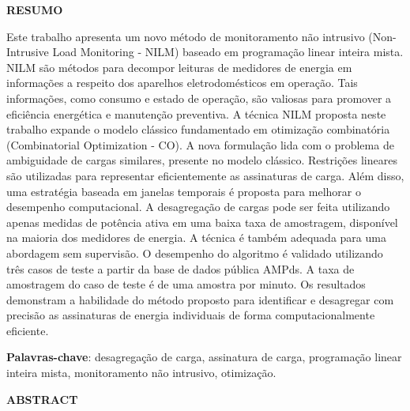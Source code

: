     
\newpage

\begin{center}
  \large{\textbf{RESUMO}}
\end{center}

Este trabalho apresenta um novo método de monitoramento não intrusivo (Non-Intrusive Load Monitoring - NILM) baseado em programação linear inteira mista. NILM são métodos para decompor leituras de medidores de energia em informações a respeito dos aparelhos eletrodomésticos em operação. Tais informações, como consumo e estado de operação, são valiosas para promover a eficiência energética e manutenção preventiva. A técnica NILM proposta neste trabalho expande o modelo clássico fundamentado em otimização combinatória (Combinatorial Optimization - CO). A nova formulação lida com o problema de ambiguidade de cargas similares, presente no modelo clássico. Restrições lineares são utilizadas para representar eficientemente as assinaturas de carga. Além disso, uma estratégia baseada em janelas temporais é proposta para melhorar o desempenho computacional. A desagregação de cargas pode ser feita utilizando apenas medidas de potência ativa em uma baixa taxa de amostragem, disponível na maioria dos medidores de energia. A técnica é também adequada para uma abordagem sem supervisão. O desempenho do algoritmo é validado utilizando três casos de teste a partir da base de dados pública AMPds. A taxa de amostragem do caso de teste é de uma amostra por minuto. Os resultados demonstram a habilidade do método proposto para identificar e desagregar com precisão as assinaturas de energia individuais de forma computacionalmente eficiente. 

\vspace{.2cm}
\textbf{Palavras-chave}:
desagregação de carga, assinatura de carga, programação linear inteira mista, monitoramento não intrusivo, otimização.

\vspace{3cm}
\newpage

\begin{center}
  \large{\textbf{ABSTRACT}}
\end{center}

